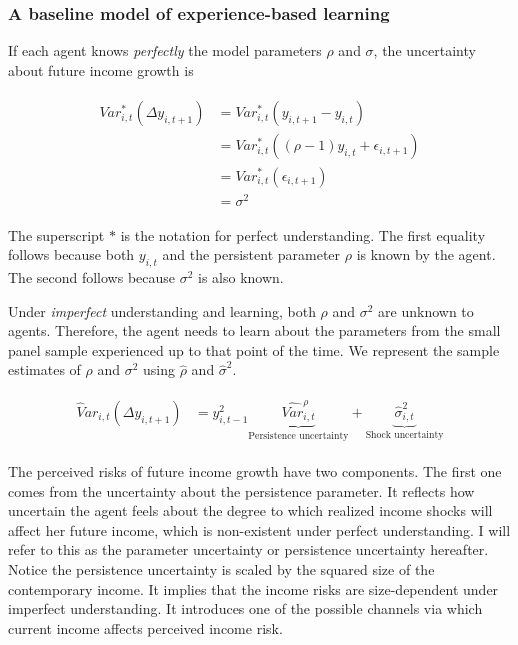 \documentclass[12pt,notitlepage,onecolumn,aps,pra]{article}
\begin{document}
    \hypertarget{a-baseline-model-of-experience-based-learning}{%
\subsubsection{A baseline model of experience-based
learning}\label{a-baseline-model-of-experience-based-learning}}

If each agent knows \emph{perfectly} the model parameters \(\rho\) and
\(\sigma\), the uncertainty about future income growth is

\begin{eqnarray}
\begin{split}
Var^*_{i,t}(\Delta y_{i,t+1}) & =  Var^*_{i,t}(y_{i,t+1}- y_{i,t}) \\ 
& =  Var^*_{i,t}((\rho-1)y_{i,t} + \epsilon_{i,t+1}) \\
& = Var^*_{i,t}(\epsilon_{i,t+1}) \\
& = \sigma^2
\end{split}
\end{eqnarray}

The superscript \(*\) is the notation for perfect understanding. The
first equality follows because both \(y_{i,t}\) and the persistent
parameter \(\rho\) is known by the agent. The second follows because
\(\sigma^2\) is also known.

Under \emph{imperfect} understanding and learning, both \(\rho\) and
\(\sigma^2\) are unknown to agents. Therefore, the agent needs to learn
about the parameters from the small panel sample experienced up to that
point of the time. We represent the sample estimates of \(\rho\) and
\(\sigma^2\) using \(\widehat \rho\) and \(\hat{\sigma}^2\).

\begin{eqnarray}
\begin{split}
\widehat Var_{i,t}(\Delta y_{i,t+1}) & = y_{i,t-1}^2 \underbrace{\widehat{Var}^{\rho}_{i,t}}_{\text{Persistence uncertainty}} + \underbrace{\hat{\sigma}^2_{i,t}}_{\text{Shock uncertainty}}
\end{split}
\end{eqnarray}

The perceived risks of future income growth have two components. The
first one comes from the uncertainty about the persistence parameter. It
reflects how uncertain the agent feels about the degree to which
realized income shocks will affect her future income, which is
non-existent under perfect understanding. I will refer to this as the
parameter uncertainty or persistence uncertainty hereafter. Notice the
persistence uncertainty is scaled by the squared size of the
contemporary income. It implies that the income risks are size-dependent
under imperfect understanding. It introduces one of the possible
channels via which current income affects perceived income risk.
\end{document}
